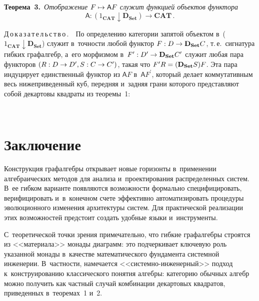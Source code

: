 \begin{multicols}{2}
     \noindent
     \textbf{Теорема~3.}\ \textit{Отображение $F\hm\mapsto \mathsf {A}F$ служит функцией 
объектов функтора}
     $$
     \mathsf {A} : (1_{\mathbf{CAT}}\downarrow 
\mathbf{D}_{\mathbf{Set}}) \to \mathbf{CAT}\,.
     $$
     
     
     \noindent
     Д\,о\,к\,а\,з\,а\,т\,е\,л\,ь\,с\,т\,в\,о\,.\ \  По определению категории запятой 
объектом в~($1_{\mathbf{CAT}}\downarrow \mathbf{D}_{\mathbf{Set}}$) служит в~точ\-ности любой 
функтор $F : D \hm\to \mathbf{D}_{\mathbf{Set}}C$, т.\,е.\ сигнатура гибких графалгебр,\linebreak 
а~его морфизмом в~$F^\prime : D^\prime \hm\to \mathbf{D}_{\mathbf{Set}}C^\prime$ 
служит любая пара функторов $(R : D \hm\to D^\prime, S : C \hm\to  C^\prime)$, 
такая что $F^\prime R \hm= (\mathbf{D}_{\mathbf{Set}}S)F$. Эта пара индуцирует 
единственный функтор из $\mathsf {A}F$ в~$\mathsf {A}F^\prime$, который 
делает коммутативным весь нижеприведенный куб, передняя и~задняя грани 
которого представляют собой декартовы квадраты из теоремы~1:

     \vspace*{1pt}
      \begin{center}
     \mbox{%
\epsfxsize=37.322mm 
}
\end{center}
     


\section{Заключение}

     Конструкция графалгебры открывает новые горизонты в~применении 
алгебраических методов для анализа и~проектирования распределенных сис\-тем. 
В~ее гибком варианте появляются возможности формально специфицировать, 
верифицировать и~в~конечном счете эффективно автоматизировать процедуры 
эволюционного изменения архитектуры систем. Для практической реализации 
этих возможностей предстоит создать удобные языки и~инструменты.
     
С~теоретической точки зрения примечательно, что гибкие графалгебры 
строятся из <<материала>> монады диаграмм: это подчеркивает ключевую 
роль указанной монады в~качестве математического фундамента сис\-тем\-ной 
инженерии. В~част\-ности, намечается <<сис\-тем\-но-ин\-же\-нер\-ный>> 
подход к~конструированию классического понятия ал\-геб\-ры: категорию 
обыч\-ных алгебр можно получить как част\-ный случай комбинации декартовых 
квад\-ра\-тов, приведенных в~тео\-ре\-мах~1 и~2.
     

\end{multicols}
